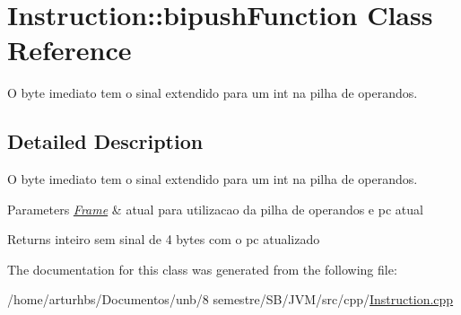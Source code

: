 \hypertarget{classInstruction_1_1bipushFunction}{}\section{Instruction\+:\+:bipush\+Function Class Reference}
\label{classInstruction_1_1bipushFunction}


O byte imediato tem o sinal extendido para um int na pilha de operandos.  




\subsection{Detailed Description}
O byte imediato tem o sinal extendido para um int na pilha de operandos. 


\begin{DoxyParams}{Parameters}
{\em \hyperlink{classFrame}{Frame}} & atual para utilizacao da pilha de operandos e pc atual \\
\hline
\end{DoxyParams}
\begin{DoxyReturn}{Returns}
inteiro sem sinal de 4 bytes com o pc atualizado 
\end{DoxyReturn}


The documentation for this class was generated from the following file\+:\begin{DoxyCompactItemize}
\item 
/home/arturhbs/\+Documentos/unb/8 semestre/\+S\+B/\+J\+V\+M/src/cpp/\hyperlink{Instruction_8cpp}{Instruction.\+cpp}\end{DoxyCompactItemize}
